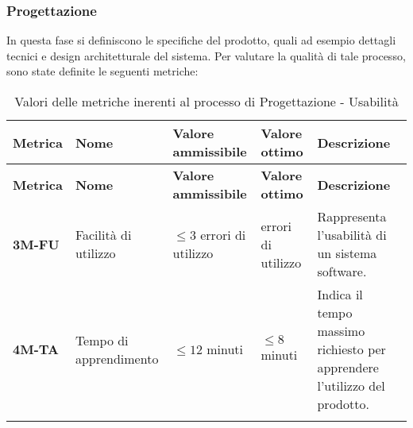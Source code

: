 \subsubsection{Progettazione}
In questa fase si definiscono le specifiche del prodotto, quali ad esempio dettagli tecnici e design architetturale del sistema.
Per valutare la qualità di tale processo, sono state definite le seguenti metriche:
\begin{longtable}{|>{\raggedright\arraybackslash}m{}|>{\raggedright\arraybackslash}m{}|>{\raggedright\arraybackslash}m{}|>{\raggedright\arraybackslash}m{}|>{\raggedright\arraybackslash}m{}|}
	\hline
	\textbf{Metrica} & \textbf{Nome}          & \textbf{Valore ammissibile}  & \textbf{Valore ottimo} & \textbf{Descrizione}                                                      \\
	\hline
	\endfirsthead
	\hline
	\textbf{Metrica} & \textbf{Nome}          & \textbf{Valore ammissibile}  & \textbf{Valore ottimo} & \textbf{Descrizione}                                                      \\
	\endhead
	\textbf{3M-FU}   & Facilità di utilizzo   & $\leq 3 $ errori di utilizzo & 0 errori di utilizzo   & Rappresenta l'usabilità di un sistema software.                           \\
	\hline
	\textbf{4M-TA}   & Tempo di apprendimento & $\leq 12 $ minuti            & $\leq 8 $ minuti       & Indica il tempo massimo richiesto per apprendere l'utilizzo del prodotto. \\
	\hline
	\caption{Valori delle metriche inerenti al processo di Progettazione - Usabilità}
	\label{table:2}
\end{longtable}


